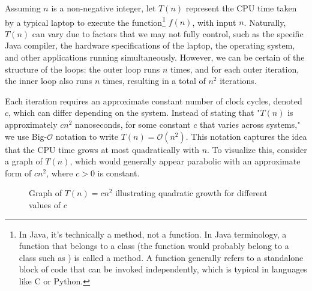 Assuming $n$ is a non-negative integer, let $T(n)$ represent the CPU time taken by a typical laptop to execute the function\footnote{In Java, it's technically a method, not a function. In Java terminology, a function that belongs to a class (the function would probably belong to a class such as ) is called a method. A function generally refers to a standalone block of code that can be invoked independently, which is typical in languages like C or Python.}  $f(n)$, with input $n$. Naturally, $T(n)$ can vary due to factors that we may not fully control, such as the specific Java compiler, the hardware specifications of the laptop, the operating system, and other applications running simultaneously. However, we can be certain of the structure of the loops: the outer loop runs $n$ times, and for each outer iteration, the inner loop also runs $n$ times, resulting in a total of $n^2$ iterations. 

Each iteration requires an approximate constant number of clock cycles, denoted \( c \), which can differ depending on the system. Instead of stating that "$T(n)$ is approximately \( cn^2 \) nanoseconds, for some constant \( c \) that varies across systems," we use Big-$\mathcal{O}$ notation to write \( T(n) = \mathcal{O}(n^2) \). This notation captures the idea that the CPU time grows at most quadratically with \( n \). To visualize this, consider a graph of \( T(n) \), which would generally appear parabolic with an approximate form of \( cn^2 \), where \( c > 0 \) is constant.

\begin{figure}[htbp]
    \centering
    \caption{Graph of $T(n) = cn^2$ illustrating quadratic growth for different values of $c$}
    \label{fig:quadratic_growth}
\end{figure}

